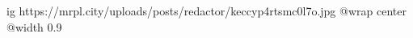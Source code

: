  
 
 
 
 

\ifcmt
  ig https://mrpl.city/uploads/posts/redactor/keccyp4rtsmc0l7o.jpg
  @wrap center
  @width 0.9
\fi
